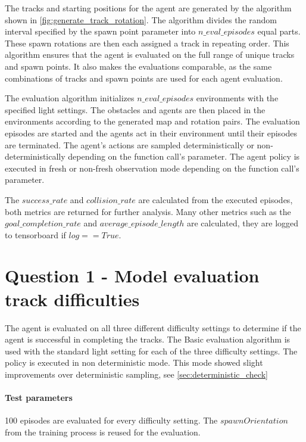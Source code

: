 The tracks and starting positions for the agent are generated by the algorithm shown in \ref{fig:generate_track_rotation}. The algorithm divides the random interval specified by the spawn point parameter into $n\_eval\_episodes$ equal parts. These spawn rotations are then each assigned a track in repeating order.
This algorithm ensures that the agent is evaluated on the full range of unique tracks and spawn points.
It also makes the evaluations comparable, as the same combinations of tracks and spawn points are used for each agent evaluation.

The evaluation algorithm initializes $n\_eval\_episodes$ environments with the specified light settings. The obstacles and agents are then placed in the environments according to the generated map and rotation pairs. The evaluation episodes are started and the agents act in their environment until their episodes are terminated. The agent's actions are sampled deterministically or non-deterministically depending on the function call's parameter. The agent policy is executed in fresh or non-fresh observation mode depending on the function call's parameter.

The $success\_rate$ and $collision\_rate$ are calculated from the executed episodes, both metrics are returned for further analysis. Many other metrics such as the $goal\_completion\_rate$ and $average\_episode\_length$ are calculated, they are logged to tensorboard if $log==True$.



\section{Question 1 - Model evaluation track difficulties}

The agent is evaluated on all three different difficulty settings to determine if the agent is successful in completing the tracks.
The Basic evaluation algorithm is used with the standard light setting for each of the three difficulty settings.
The policy is executed in non deterministic mode. This mode showed slight improvements over deterministic sampling, see \ref{sec:deterministic_check}



\paragraph{Test parameters}

100 episodes are evaluated for every difficulty setting. The $spawnOrientation$ from the training process is reused for the evaluation.



